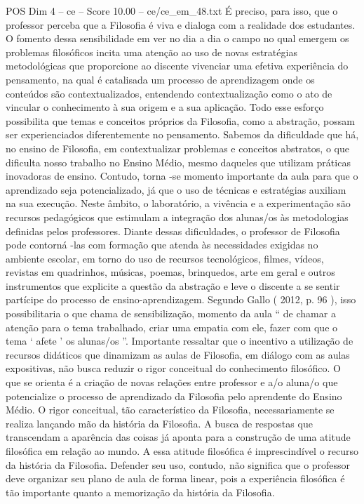 \begin{textsample}{POS Dim 4 – ce – Score 10.00 – ce/ce\_em\_48.txt}
É preciso, para isso, que o professor perceba que a Filosofia é viva e dialoga com a realidade dos estudantes.
O fomento dessa sensibilidade em ver no dia a dia o campo no qual emergem os problemas filosóficos incita uma atenção ao uso de novas estratégias metodológicas que proporcione ao discente vivenciar uma efetiva experiência do pensamento, na qual é catalisada um processo de aprendizagem onde os conteúdos são contextualizados, entendendo contextualização como o ato de vincular o conhecimento à sua origem e a sua aplicação.
Todo esse esforço possibilita que temas e conceitos próprios da Filosofia, como a abstração, possam ser experienciados diferentemente no pensamento.
Sabemos da dificuldade que há, no ensino de Filosofia, em contextualizar problemas e conceitos abstratos, o que dificulta nosso trabalho no Ensino Médio, mesmo daqueles que utilizam práticas inovadoras de ensino.
Contudo, torna -se momento importante da aula para que o aprendizado seja potencializado, já que o uso de técnicas e estratégias auxiliam na sua execução.
Neste âmbito, o laboratório, a vivência e a experimentação são recursos pedagógicos que estimulam a integração dos alunas/os às metodologias definidas pelos professores.
Diante dessas dificuldades, o professor de Filosofia pode contorná -las com formação que atenda às necessidades exigidas no ambiente escolar, em torno do uso de recursos tecnológicos, filmes, vídeos, revistas em quadrinhos, músicas, poemas, brinquedos, arte em geral e outros instrumentos que explicite a questão da abstração e leve o discente a se sentir partícipe do processo de ensino-aprendizagem.
Segundo Gallo ( 2012, p. 96 ), isso possibilitaria o que chama de sensibilização, momento da aula “ de chamar a atenção para o tema trabalhado, criar uma empatia com ele, fazer com que o tema ‘ afete ’ os alunas/os ”.
Importante ressaltar que o incentivo a utilização de recursos didáticos que dinamizam as aulas de Filosofia, em diálogo com as aulas expositivas, não busca reduzir o rigor conceitual do conhecimento filosófico.
O que se orienta é a criação de novas relações entre professor e a/o aluna/o que potencialize o processo de aprendizado da Filosofia pelo aprendente do Ensino Médio.
O rigor conceitual, tão característico da Filosofia, necessariamente se realiza lançando mão da história da Filosofia.
A busca de respostas que transcendam a aparência das coisas já aponta para a construção de uma atitude filosófica em relação ao mundo.
A essa atitude filosófica é imprescindível o recurso da história da Filosofia.
Defender seu uso, contudo, não significa que o professor deve organizar seu plano de aula de forma linear, pois a experiência filosófica é tão importante quanto a memorização da história da Filosofia.

\end{textsample}
